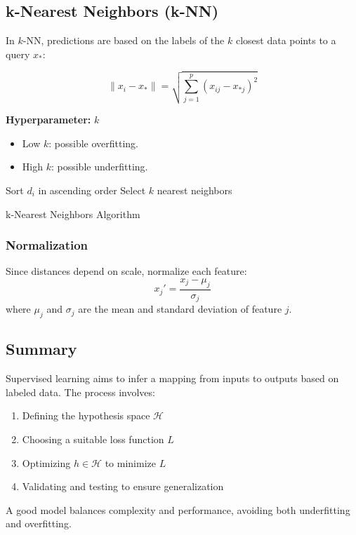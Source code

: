\subsection{k-Nearest Neighbors (k-NN)}

In $k$-NN, predictions are based on the labels of the $k$ closest data points to a query $x_*$:

\[
\|x_i - x_*\| = \sqrt{\sum_{j=1}^{p}(x_{ij} - x_{*j})^2}
\]

\textbf{Hyperparameter:} $k$
\begin{itemize}
    \item Low $k$: possible overfitting.
    \item High $k$: possible underfitting.
\end{itemize}

\begin{algorithm}[H]
\SetAlgoLined
{}
\BlankLine
{}
Sort $d_i$ in ascending order\;
Select $k$ nearest neighbors\;
\caption{k-Nearest Neighbors Algorithm}
\end{algorithm}

\subsubsection{Normalization}

Since distances depend on scale, normalize each feature:
\[
x_j' = \frac{x_j - \mu_j}{\sigma_j}
\]
where $\mu_j$ and $\sigma_j$ are the mean and standard deviation of feature $j$.

\subsection{Summary}

Supervised learning aims to infer a mapping from inputs to outputs based on labeled data.
The process involves:
\begin{enumerate}
    \item Defining the hypothesis space $\mathcal{H}$
    \item Choosing a suitable loss function $L$
    \item Optimizing $h \in \mathcal{H}$ to minimize $L$
    \item Validating and testing to ensure generalization
\end{enumerate}

A good model balances complexity and performance, avoiding both underfitting and overfitting.


